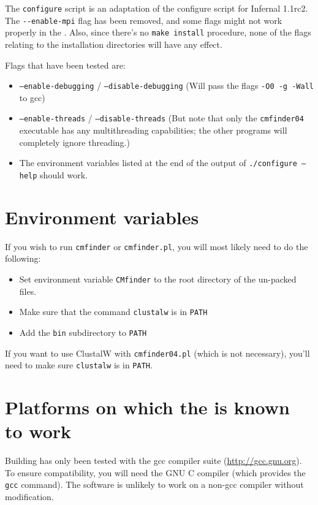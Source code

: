 \documentclass[letterpaper,12pt]{report}
\begin{document}
The {\tt configure} script is an adaptation of the configure script for Infernal 1.1rc2.  The {\tt -{}-enable-mpi} flag has been removed, and some flags might not work properly in the \PackageName.  Also, since there's no {\tt make install} procedure, none of the flags relating to the installation directories will have any effect.

Flags that have been tested are:
\begin{itemize}
\item {\tt --enable-debugging} / {\tt --disable-debugging} (Will pass the flags {\tt -O0 -g -Wall} to gcc)
\item {\tt --enable-threads} / {\tt --disable-threads}  (But note that only the {\tt cmfinder04} executable has any multithreading capabilities; the other programs will completely ignore threading.)
\item The environment variables listed at the end of the output of {\tt ./configure --help} should work.
\end{itemize}

\section{Environment variables}

If you wish to run {\tt cmfinder} or {\tt cmfinder.pl}, you will most likely need to do the following:
\begin{itemize}
\item Set environment variable {\tt CMfinder} to the root directory of the un-packed files.
\item Make sure that the command {\tt clustalw} is in {\tt PATH}
\item Add the {\tt bin} subdirectory to {\tt PATH}
\end{itemize} 

If you want to use ClustalW with {\tt cmfinder04.pl} (which is not necessary), you'll need to make sure {\tt clustalw} is in {\tt PATH}.

\section{Platforms on which the \PackageName{} is known to work}

Building has only been tested with the gcc compiler suite (\url{http://gcc.gnu.org}).  To ensure compatibility, you will need the GNU C compiler (which provides the {\tt gcc} command).  The software is unlikely to work on a non-gcc compiler without modification.
\end{document}
